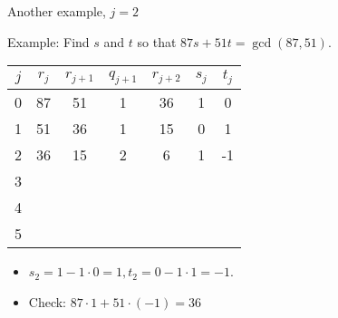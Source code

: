 \documentclass{beamer}
\begin{document}
\begin{frame}{Another example, $j=2$}

Example: Find $s$ and $t$ so that $87s+51t = \gcd(87, 51)$.

\vspace{1em}

\begin{tabular}{|c|c|c|c|c|c|c|}\hline
$j$   &  $r_{j}$    & $r_{j+1}$ & $q_{j+1}$ & $r_{j+2}$ & $s_j$ & $t_j$ \\ \hline\hline
0     &  87         &  51       &    1      &   36      &  1    &   0   \\ \hline
1     &  51         &  36       &    1      &   15      &  0    &   1   \\ \hline
2     &  36         &  15       &    2      &    6      &  1    &  -1   \\ \hline
3     &             &           &           &           &       &       \\ \hline
4     &             &           &           &           &       &       \\ \hline
5     &             &           &           &           &       &       \\ \hline
\end{tabular}

\vspace{1em}

\begin{itemize}
  \item $s_2 = 1 - 1\cdot 0 = 1, t_2 = 0 - 1\cdot 1 = -1$.
  \item Check: $87\cdot 1 + 51\cdot (-1) = 36$
\end{itemize}

\end{frame}
\end{document}
